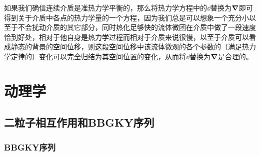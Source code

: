 如果我们确信连续介质是准热力学平衡的，那么将热力学方程中的$\dd$替换为$\grad$即可得到关于介质中各点的热力学量的一个方程，因为我们总是可以想象一个充分小以至于不会扰动介质的其它部分，同时热化足够快的流体微团在介质中做了一段速度恰到好处，相对于他自身是热力学过程而相对于介质来说很慢，以至于介质可以看成静态的背景的空间位移，则这段空间位移中该流体微观的各个参数的（满足热力学定律的）变化可以完全归结为其空间位置的变化，从而将$\dd$替换为$\grad$是合理的。

\chapter{动理学}

\section{二粒子相互作用和BBGKY序列}

\subsection{BBGKY序列}\label{sec:bbgky}

